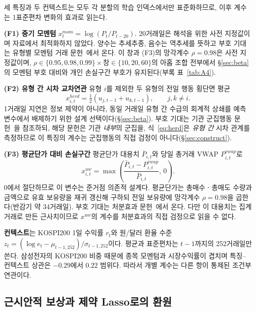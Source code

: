 세 특징과 두 컨텍스트는 모두 각 분할의 학습 인덱스에서만 표준화하므로, 이후 계수는
1표준편차 변화의 효과로 읽는다.

\textbf{(F1) 중기 모멘텀} $x^{mom}_{t}=\log(P_t/P_{t-20})$. 20거래일은 해석을 위한
사전 지정값이며 자료에서 최적화하지 않았다. 양수는 추세추종, 음수는 역추세를 뜻하고
부호 기대는 유형별 모멘텀 거래 문헌~\cite{grinblatt2000investment,choe1999foreign}에서
온다. 이 창과 (F3)의 망각계수 $\rho=0.98$은 사전 지정값이며,
$\rho\in\{0.95,0.98,0.99\}\times$창$\in\{10,20,60\}$의 아홉 조합 전부에서
\S\ref{sec:beta}의 모멘텀 부호 대비와 개인 손실구간 부호가 유지된다(부록
표~\ref{tab:A4}).

\textbf{(F2) 유형 간 시차 교차연관} 유형 $i$를 제외한 두 유형의 전일 행동 횡단면
평균
\begin{equation}
x^{herd}_{i,t}=\tfrac{1}{2}\left(u_{j,t-1}+u_{k,t-1}\right),\qquad j,k\neq i.
\label{eq:herd}
\end{equation}
1거래일 지연은 정보 제약이 아니라, 동일 거래일 유형 간 수급의 회계적 상쇄를 예측
변수에서 배제하기 위한 설계 선택이다(\S\ref{sec:beta}). 부호 기대는 기관 군집행동
문헌~\cite{lakonishok1992impact}을 참조하되, 해당 문헌은 기관 \emph{내부}의 군집을,
식~\eqref{eq:herd}은 \emph{유형 간} 시차 관계를 측정하므로 이 특징의 계수는
군집행동의 직접 검정이 아니다(\S\ref{sec:construct}).

\textbf{(F3) 평균단가 대비 손실구간} 평균단가 대용치 $\bar P_{i,t}$와 당일 총거래
VWAP $P^{vwap}_{i,t}$로
\begin{equation}
x^{uw}_{i,t}=\max\!\left(
\frac{\bar P_{i,t}-P^{vwap}_{i,t}}{\bar P_{i,t}},\,0\right).
\label{eq:underwater}
\end{equation}
0에서 절단하므로 이 변수는 준거점 의존적 설계다. 평균단가는 총매수ㆍ총매도 수량과
금액으로 유효 보유량을 재귀 갱신해 구하되 전일 보유량에 망각계수 $\rho=0.98$을
곱한다(반감기 약 34거래일). 부호 기대는 처분효과
문헌~\cite{shefrin1985disposition,odean1998investors}에서 온다. 다만 이 대용치는
집계 거래로 만든 근사치이므로 $x^{uw}$의 계수를 처분효과의 직접 검정으로 읽을 수
없다.

\textbf{컨텍스트}는 KOSPI200 1일 수익률 $r_t$와 원/달러 환율 수준
$z_t=(\log e_t-\mu_{t-1,252})/\sigma_{t-1,252}$이다. 평균과 표준편차는 $t-1$까지의
252거래일만 쓴다. 삼성전자의 KOSPI200 비중 때문에 종목 모멘텀과 시장수익률이
겹치며 특징--컨텍스트 상관은 $-0.29$에서 $0.22$ 범위다. 따라서 개별 계수는 다른
항이 통제된 조건부 연관이다.

\subsection{근시안적 보상과 제약 Lasso로의 환원}
\label{sec:model}

